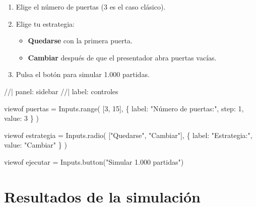 \documentclass[
  spanish,
  letterpaper,
  DIV=11,
  numbers=noendperiod,
  oneside]{scrreprt}
\newenvironment{Shaded}{\begin{snugshade}}{\end{snugshade}}
\newcommand{\NormalTok}[1]{\textcolor[rgb]{0.00,0.23,0.31}{#1}}
\providecommand{\tightlist}{%
  \setlength{\itemsep}{0pt}\setlength{\parskip}{0pt}}
\begin{document}
\begin{tcolorbox}[enhanced jigsaw, arc=.35mm, bottomrule=.15mm, bottomtitle=1mm, breakable, colback=white, colbacktitle=quarto-callout-note-color!10!white, colframe=quarto-callout-note-color-frame, coltitle=black, left=2mm, leftrule=.75mm, opacityback=0, opacitybacktitle=0.6, rightrule=.15mm, title=\textcolor{quarto-callout-note-color}{\faInfo}\hspace{0.5em}{Cómo jugar}, titlerule=0mm, toprule=.15mm, toptitle=1mm]

\begin{enumerate}
\def\labelenumi{\arabic{enumi}.}
\tightlist
\item
  Elige el número de puertas (3 es el caso clásico).
\item
  Elige tu estrategia:

  \begin{itemize}
  \tightlist
  \item
    \textbf{Quedarse} con la primera puerta.
  \item
    \textbf{Cambiar} después de que el presentador abra puertas vacías.
  \end{itemize}
\item
  Pulsa el botón para simular 1.000 partidas.
\end{enumerate}

\end{tcolorbox}

\begin{Shaded}
\begin{Highlighting}[]
\NormalTok{//| panel: sidebar}
\NormalTok{//| label: controles}

\NormalTok{viewof puertas = Inputs.range(}
\NormalTok{  [3, 15],}
\NormalTok{  \{}
\NormalTok{    label: "Número de puertas:",}
\NormalTok{    step: 1,}
\NormalTok{    value: 3}
\NormalTok{  \}}
\NormalTok{)}

\NormalTok{viewof estrategia = Inputs.radio(}
\NormalTok{  ["Quedarse", "Cambiar"],}
\NormalTok{  \{}
\NormalTok{    label: "Estrategia:",}
\NormalTok{    value: "Cambiar"}
\NormalTok{  \}}
\NormalTok{)}

\NormalTok{viewof ejecutar = Inputs.button("Simular 1.000 partidas")}
\end{Highlighting}
\end{Shaded}

\section{Resultados de la
simulación}\label{resultados-de-la-simulaciuxf3n}
\end{document}

